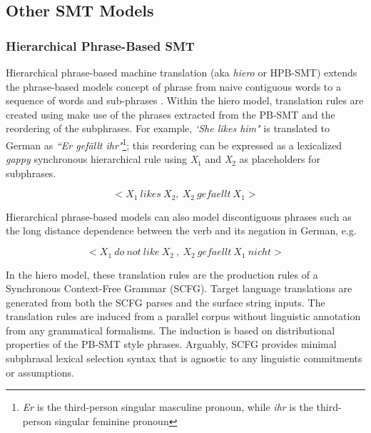 \subsection{Other SMT Models}

\subsubsection{Hierarchical Phrase-Based SMT}
Hierarchical phrase-based machine translation (aka \emph{hiero} or HPB-SMT) extends the phrase-based models concept of phrase from naive contiguous words to a sequence of words and sub-phrases \citep{chiang2005hierarchical}. Within the hiero model, translation rules are created using make use of the phrases extracted from the PB-SMT and the reordering of the subphrases. For example, \emph{`She likes him"} is translated to German as \emph{``Er gef\"{a}llt ihr"}\footnote{\emph{Er} is the third-person singular masculine pronoun, while \emph{ihr} is the third-person singular feminine pronoun}; this reordering can be expressed as a lexicalized \emph{gappy} synchronous hierarchical rule using \emph{X$_{1}$} and \emph{X$_{2}$} as placeholders for  subphrases.


\begin{equation}
< X{_1}\ likes\ X{_2} ,\ X{_2}\ gefaellt\  X{_1} >
\end{equation}

Hierarchical phrase-based models can also model discontiguous phrases such as the long distance dependence between the verb and its negation in German, e.g.

\begin{equation}
< X{_1}\ do\ not\ like\ X{_2}\ ,\ X{_2}\ gefaellt\  X{_1}\ nicht>
\end{equation}

In the hiero model, these translation rules are the production rules of a Synchronous Context-Free Grammar (SCFG). Target language translations are generated from both the SCFG parses and the surface string inputs. The translation rules are induced from a parallel corpus without linguistic annotation from any grammatical formalisms. The induction is based on distributional properties of the PB-SMT style phrases. Arguably, SCFG provides minimal subphrasal lexical selection syntax that is agnostic to any linguistic commitments or assumptions. 

